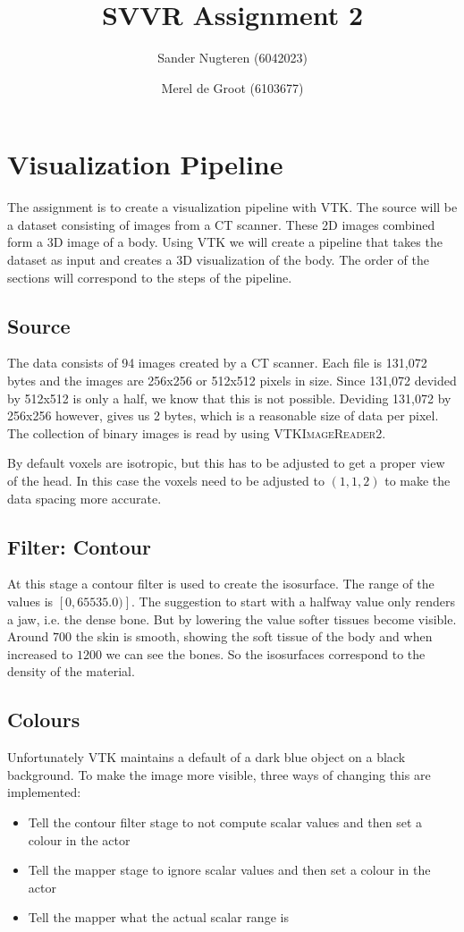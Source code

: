 \documentclass{article}
\begin{document}
\title{SVVR Assignment 2}
\author{Sander Nugteren (6042023) \and Merel de Groot (6103677)}
\renewcommand{\today}{November 17, 2014}
\maketitle

\section{Visualization Pipeline}
The assignment is to create a visualization pipeline with VTK. The source will be a dataset consisting of images from a CT scanner. These 2D images combined form a 3D image of a body. Using VTK we will create a pipeline that takes the dataset as input and creates a 3D visualization of the body. The order of the sections will correspond to the steps of the pipeline.

\subsection{Source}
The data consists of 94 images created by a CT scanner. Each file is 131,072 bytes and the images are 256x256 or 512x512 pixels in size. Since 131,072 devided by 512x512 is only a half, we know that this is not possible. Deviding 131,072 by 256x256 however, gives us 2 bytes, which is a reasonable size of data per pixel. The collection of binary images is read by using \textsc{VTKImageReader2}.

By default voxels are isotropic, but this has to be adjusted to get a proper view of the head. In this case the voxels need to be adjusted to $(1,1,2)$ to make the data spacing more accurate.

\subsection{Filter: Contour}
At this stage a contour filter is used to create the isosurface. The range of the values is $\left[ 0,  65535.0) \right]$. The suggestion to start with a halfway value only renders a jaw, i.e. the dense bone. But by lowering the value softer tissues become visible. Around $700$ the skin is smooth, showing the soft tissue of the body and when increased to $1200$ we can see the bones. So the isosurfaces correspond to the density of the material.

\subsection{Colours}
Unfortunately VTK maintains a default of a dark blue object on a black background. To make the image more visible, three ways of changing this are implemented:
\begin{itemize}
\item Tell the contour filter stage to not compute scalar values and then set a colour in the actor
\item Tell the mapper stage to ignore scalar values and then set a colour in the actor
\item Tell the mapper what the actual scalar range is
\end{itemize}
\end{document}
